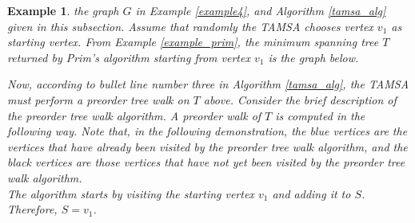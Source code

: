 \documentclass[12pt]{article}
\newtheorem{example}[definition]{Example}
\numberwithin{equation}{subsection}
\numberwithin{table}{subsection}
\numberwithin{algorithm}{subsection}
\numberwithin{figure}{subsection}
\begin{document}
\begin{example}
\label{tamsa_demonstration}
 the graph $G$ in Example \ref{example4}, and Algorithm \ref{tamsa_alg} given in this subsection. Assume that randomly the TAMSA chooses vertex $v_1$ as starting vertex. From Example \ref{example_prim}, the minimum spanning tree $T$ returned by Prim's algorithm starting from vertex $v_1$ is the graph below.
\begin{center}
\end{center}
Now, according to bullet line number three in Algorithm \ref{tamsa_alg}, the TAMSA must perform a preorder tree walk on $T$ above. Consider the brief description of the preorder tree walk algorithm. A preorder walk of $T$ is computed in the following way. Note that, in the following demonstration, the blue vertices are the vertices that have already been visited by the preorder tree walk algorithm, and the black vertices are those vertices that have not yet been visited by the preorder tree walk algorithm.\\
The algorithm starts by visiting the starting vertex $v_1$ and adding it to $S$. Therefore, $S = v_1$.
\begin{center}
\end{center}
\end{example}
\end{document}
